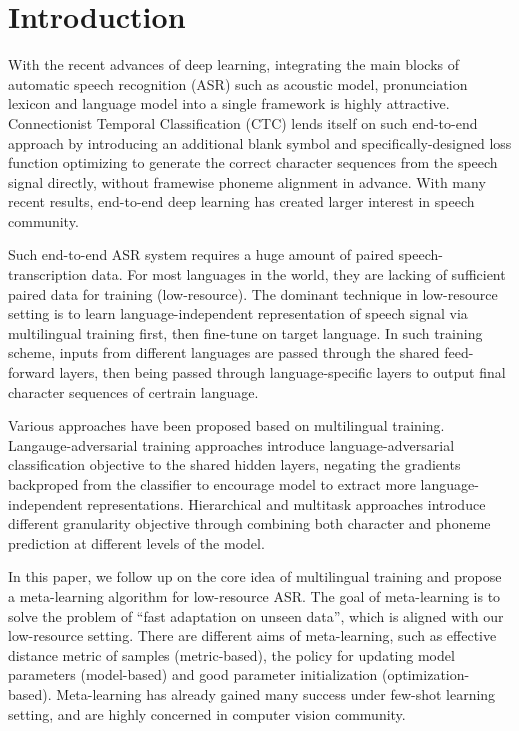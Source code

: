\section{Introduction}
With the recent advances of deep learning, integrating the main blocks of automatic speech recognition (ASR) such as acoustic model, pronunciation lexicon and language model into a single framework is highly attractive. Connectionist Temporal Classification (CTC) lends itself on such end-to-end approach by introducing an additional blank symbol and specifically-designed loss function optimizing to generate the correct character sequences from the speech signal directly, without framewise phoneme alignment in advance. With many recent results, end-to-end deep learning has created larger interest in speech community.

Such end-to-end ASR system requires a huge amount of paired speech-transcription data. For most languages in the world, they are lacking of sufficient paired data for training (low-resource). The dominant technique in low-resource setting is to learn language-independent representation of speech signal via multilingual training first, then fine-tune on target language. In such training scheme, inputs from different languages are passed through the shared feed-forward layers, then being passed through language-specific layers to output final character sequences of certrain language.

Various approaches have been proposed based on multilingual training. Langauge-adversarial training approaches introduce language-adversarial classification objective to the shared hidden layers, negating the gradients backproped from the classifier to encourage model to extract more language-independent representations. Hierarchical and multitask approaches introduce different granularity objective through combining both character and phoneme prediction at different levels of the model.



In this paper, we follow up on the core idea of multilingual training and propose a meta-learning algorithm for low-resource ASR. The goal of meta-learning is to solve the problem of ``fast adaptation on unseen data'', which is aligned with our low-resource setting. There are different aims of meta-learning, such as effective distance metric of samples (metric-based), the policy for updating model parameters (model-based) and good parameter initialization (optimization-based). Meta-learning has already gained many success under few-shot learning setting, and are highly concerned in computer vision community. 

